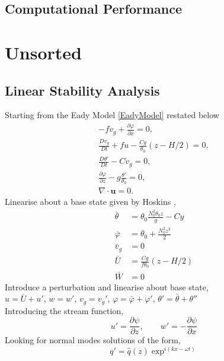 \section{Computational Performance}
\chapter{Unsorted}
\section{Linear Stability Analysis}
Starting from the Eady Model \ref{EadyModel} restated below
\begin{equation}
\begin{aligned}
-fv_g + \frac{\partial \varphi}{\partial x} = 0,\\
\frac{Dv_g}{Dt} + fu -\frac{Cg}{\theta _0}\left(z-H/2\right) = 0,\\
\frac{D\theta'}{Dt} - Cv_g = 0,\\
\frac{\partial \varphi}{\partial z} - g\frac{\theta'}{\theta_0} = 0,\\
\nabla \cdot \bm{u} = 0.
\end{aligned}
\label{EadyModel2}
\end{equation} 
Linearise about a base state given by Hoskins \cite{Hoskins1975},
\begin{equation}
\begin{aligned}
\bar{\theta} &= \theta_0 \frac{N_0^2\theta_0 z}{g} - Cy \\
\bar{\varphi} &= \theta_0 + \frac{N_0^2 z^2}{2}\\
\bar{v}_g &= 0\\
\bar{U} &= \frac{Cg}{f\theta_0}\left(z - H/2\right)\\
\bar{W} &= 0 
\end{aligned}
\end{equation}
Introduce a perturbation and linearise about base state,\\
$u = \bar{U} + u'$, $w = w'$, $v_g =  v_g'$, $\varphi = \bar{\varphi} + \varphi'$, $\theta ' = \bar{\theta} + \theta ''$\\
Introducing the stream function,
\begin{equation}
u' = \frac{\partial \psi}{\partial z},\qquad w' = -\frac{\partial \psi}{\partial x} 
\end{equation}
Looking for normal modes solutions of the form,
\begin{equation*}
q' = \hat{q}(z)\exp^{i \left(kx - \omega t\right)}
\end{equation*}

